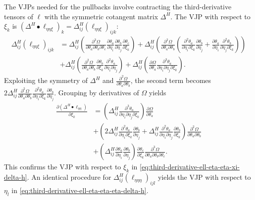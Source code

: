 \documentclass{article}
\begin{document}
The VJPs needed for the pullbacks involve contracting the third-derivative tensors of $\ell$ with the symmetric cotangent matrix $\Delta^H$.
The VJP with respect to $\xi_k$ is $(\Delta^H \bullet \ell_{\eta\eta\xi})_k = \Delta^H_{ij} (\ell_{\eta\eta\xi})_{ijk}$:
%
\begin{align}
  \Delta^H_{ij} (\ell_{\eta\eta\xi})_{ijk} & = \Delta^H_{ij} \left( \frac{\partial^3 \Omega}{\partial \theta_a \partial \theta_b \partial \theta_c} \frac{\partial \theta_a}{\partial \eta_i} \frac{\partial \theta_b}{\partial \eta_j} \frac{\partial \theta_c}{\partial \xi_k} \right) + \Delta^H_{ij} \left( \frac{\partial^2 \Omega}{\partial \theta_a \partial \theta_b} \left( \frac{\partial^2 \theta_a}{\partial \eta_i \partial \xi_k} \frac{\partial \theta_b}{\partial \eta_j} + \frac{\partial \theta_a}{\partial \eta_i} \frac{\partial^2 \theta_b}{\partial \eta_j \partial \xi_k} \right) \right) \\
                                           & + \Delta^H_{ij} \left( \frac{\partial^2 \Omega}{\partial \theta_a \partial \theta_b} \frac{\partial \theta_b}{\partial \xi_k} \frac{\partial^2 \theta_a}{\partial \eta_i \partial \eta_j} \right) + \Delta^H_{ij} \left( \frac{\partial \Omega}{\partial \theta_a} \frac{\partial^3 \theta_a}{\partial \eta_i \partial \eta_j \partial \xi_k} \right).
\end{align}
%
Exploiting the symmetry of $\Delta^H$ and $\frac{\partial^2 \Omega}{\partial \theta_a \partial \theta_b}$, the second term becomes $2 \Delta^H_{ij} \frac{\partial^2 \Omega}{\partial \theta_a \partial \theta_b} \frac{\partial^2 \theta_a}{\partial \eta_i \partial \xi_k} \frac{\partial \theta_b}{\partial \eta_j}$.
Grouping by derivatives of $\Omega$ yields
%
\begin{align}
  \frac{\partial (\Delta^H \bullet \ell_{\eta\eta})}{\partial \xi_k} & = \left( \Delta^H_{ij} \frac{\partial^3 \theta_a}{\partial \eta_i \partial \eta_j \partial \xi_k} \right) \frac{\partial \Omega}{\partial \theta_a}                                                                                                                                                                      \\
                                                                     & + \left( 2 \Delta^H_{ij} \frac{\partial^2 \theta_a}{\partial \eta_i \partial \xi_k} \frac{\partial \theta_b}{\partial \eta_j} + \Delta^H_{ij} \frac{\partial^2 \theta_a}{\partial \eta_i \partial \eta_j} \frac{\partial \theta_b}{\partial \xi_k} \right) \frac{\partial^2 \Omega}{\partial \theta_a \partial \theta_b} \\
                                                                     & + \left( \Delta^H_{ij} \frac{\partial \theta_a}{\partial \eta_i} \frac{\partial \theta_b}{\partial \eta_j} \right) \frac{\partial \theta_c}{\partial \xi_k} \frac{\partial^3 \Omega}{\partial \theta_a \partial \theta_b \partial \theta_c}.
\end{align}
%
This confirms the VJP with respect to $\xi_k$ in \cref{eq:third-derivative-ell-eta-eta-xi-delta-h}.
An identical procedure for $\Delta^H_{ij} (\ell_{\eta\eta\eta})_{ijl}$ yields the VJP with respect to $\eta_l$ in \cref{eq:third-derivative-ell-eta-eta-eta-delta-h}.
\end{document}
